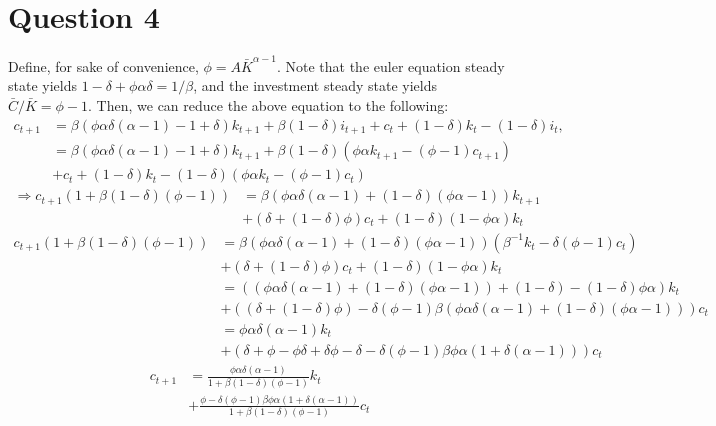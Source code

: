 \documentclass[11pt]{article} %
\begin{document}
\section{Question 4}
Define, for sake of convenience, $ \phi = A\bar{K}^{\alpha - 1}$. Note that the euler equation steady state yields $1-\delta + \phi \alpha \delta = 1/\beta$, and the investment steady state yields $\bar{C}/\bar{K} = \phi - 1$. Then, we can reduce the above equation to the following:
\begin{align*}
c_{t+1} &= \beta( \phi \alpha \delta (\alpha - 1) - 1+\delta)k_{t+1} + \beta(1-\delta) i_{t+1} + c_t + (1-\delta) k_t - (1-\delta) i_t,\\
&= \beta(\phi \alpha \delta  (\alpha - 1) - 1+\delta)k_{t+1} + \beta(1-\delta)\left(\phi \alpha k_{t+1} - (\phi - 1)c_{t+1} \right)  \\&+ c_t + (1-\delta) k_t - (1-\delta) \left( \phi \alpha k_t - (\phi - 1)c_t \right)
\end{align*}
\begin{align*}
\Rightarrow c_{t+1}\left( 1 + \beta(1-\delta) (\phi - 1)\right) &=  \beta(\phi \alpha \delta  (\alpha - 1) + (1-\delta)(\phi \alpha - 1))k_{t+1}   \\&+(\delta  +(1-\delta) \phi) c_t +  (1-\delta)\left( 1-\phi \alpha \right)k_t 
\end{align*}
\begin{align*}
c_{t+1}\left( 1 + \beta(1-\delta) (\phi - 1)\right)  &=  \beta(\phi \alpha \delta  (\alpha - 1) + (1-\delta)(\phi \alpha  - 1))\left( \beta^{-1}k_t - \delta(\phi - 1)c_t \right)\\ &+(\delta  +(1-\delta) \phi) c_t +  (1-\delta)\left( 1-\phi \alpha  \right)k_t \\
&= ((\phi \alpha \delta  (\alpha - 1) + (1-\delta)(\phi \alpha  - 1)) + (1-\delta) - (1-\delta)\phi\alpha)k_t \\&+ ((\delta  +(1-\delta) \phi) - \delta(\phi - 1)\beta (\phi \alpha \delta  (\alpha - 1) + (1-\delta)(\phi \alpha  - 1)))c_t\\
&= \phi \alpha \delta (\alpha - 1)k_t \\&+ (\delta  +\phi-\phi\delta + \delta\phi - \delta -  \delta(\phi - 1)\beta \phi \alpha (1 + \delta(\alpha - 1)))c_t
\end{align*}
\begin{align*}
c_{t+1} &= \frac{\phi \alpha \delta (\alpha - 1)}{1 + \beta(1-\delta) (\phi - 1)}k_{t}\\ &+ \frac{\phi -  \delta(\phi - 1)\beta \phi \alpha (1 + \delta(\alpha - 1))}{1 + \beta(1-\delta) (\phi - 1)}c_t
\end{align*}
\end{document}
